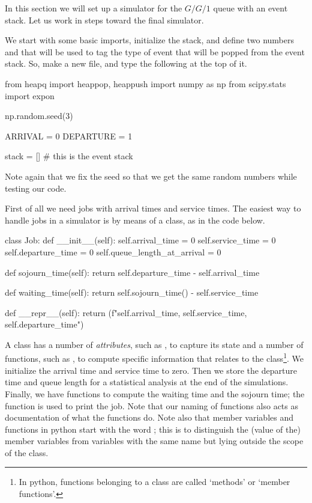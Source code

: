 In this section we will set up a simulator for the $G/G/1$ queue with  an event stack. Let us work in steps toward the final simulator.

We start with some basic imports, initialize the stack, and define two numbers  and  that will be used to tag the type of event that will be popped from the event stack.
So, make a new file, and type the following at the top of it.

\begin{pyverbatim}
from heapq import heappop, heappush
import numpy as np 
from scipy.stats import expon

np.random.seed(3) 

ARRIVAL = 0
DEPARTURE = 1

stack = [] # this is the event stack
\end{pyverbatim}

Note again that we fix the seed so that we get the same random numbers while testing our code. 


First of all we need jobs with arrival times and service times. The easiest way to handle jobs in a simulator is by means of a class, as in the code below.


\begin{pyverbatim}
class Job:
    def __init__(self):
        self.arrival_time = 0
        self.service_time = 0
        self.departure_time = 0
        self.queue_length_at_arrival = 0

    def sojourn_time(self):
        return self.departure_time - self.arrival_time

    def waiting_time(self):
        return self.sojourn_time() - self.service_time

    def __repr__(self):
        return (f"{self.arrival_time}, {self.service_time}, {self.departure_time}\n")

  
\end{pyverbatim}

A class has a number of \emph{attributes}, such as , to capture its state and a number of functions, such as , to compute specific information that relates to the class\footnote{In python, functions belonging to a class are called `methods' or `member functions'.}.
We initialize the arrival time and service time to zero.
Then we store the departure time and queue length for a statistical analysis at the end of the simulations.
Finally, we have functions to compute the waiting time and the sojourn time; the  function is used to print the job.
Note that our naming of functions also acts as documentation of what the functions do.
Note also that member variables and functions in python start with the word ; this is to distinguish the (value of the) member variables from variables with the same name but lying outside the scope of the class.

